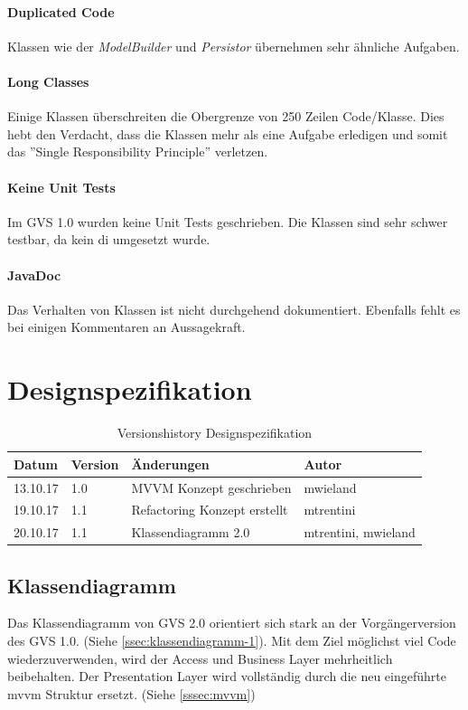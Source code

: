 \documentclass[11pt,a4paper,english,oneside]{book}
\numberwithin{equation}{chapter}
\begin{document}
	\subsubsection{Duplicated Code}
	Klassen wie der \textit{ModelBuilder} und \textit{Persistor} übernehmen sehr ähnliche Aufgaben.
	
	\subsubsection{Long Classes}
	Einige Klassen überschreiten die Obergrenze von 250 Zeilen Code/Klasse. Dies hebt den Verdacht, dass die Klassen mehr als eine Aufgabe erledigen und somit das ''Single Responsibility Principle'' verletzen.
	
	\subsubsection{Keine Unit Tests} Im GVS 1.0 wurden keine Unit Tests geschrieben. Die Klassen sind sehr schwer testbar, da kein \gls{di} umgesetzt wurde.
	
	\subsubsection{JavaDoc}
	Das Verhalten von Klassen ist nicht durchgehend dokumentiert.  Ebenfalls fehlt es bei einigen Kommentaren an Aussagekraft.	

		
	\chapter{Designspezifikation}
	
	\begin{table}[h!]
		\centering
		\begin{tabularx}{\linewidth}{l l X l}
			\toprule 
			Datum & Version & Änderungen & Autor \\
			\midrule
			13.10.17 & 1.0 & MVVM Konzept geschrieben & mwieland \\
			19.10.17 & 1.1 & Refactoring Konzept erstellt & mtrentini \\
			20.10.17 & 1.1 & Klassendiagramm 2.0 & mtrentini, mwieland \\
			\bottomrule 
		\end{tabularx} 
		\caption{Versionshistory Designspezifikation} 
	\end{table}
	
	\section{Klassendiagramm} \label{sec:class-diagram}
	Das Klassendiagramm von GVS 2.0 orientiert sich stark an der Vorgängerversion des GVS 1.0. (Siehe \ref{ssec:klassendiagramm-1}). Mit dem Ziel möglichst viel Code wiederzuverwenden, wird der Access und Business Layer mehrheitlich beibehalten. Der Presentation Layer wird vollständig durch die neu eingeführte \gls{mvvm} Struktur ersetzt. (Siehe \ref{sssec:mvvm})
	
\end{document}

